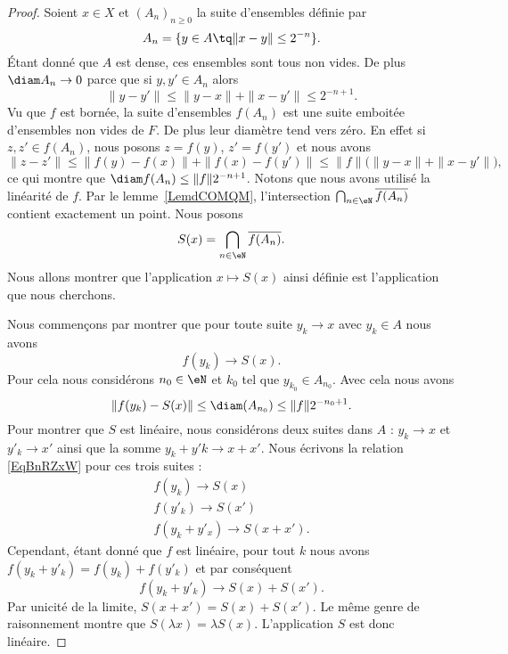 \begin{proof}
	Soient \( x\in X\) et \( (A_n)_{n\geq 0}\) la suite d'ensembles définie par
	\begin{equation}
		A_n=\{ y\in A\tq \| x-y \|\leq 2^{-n}\}.
	\end{equation}
	Étant donné que \( A\) est dense, ces ensembles sont tous non vides. De plus \( \diam A_n\to 0\) parce que si \( y,y'\in A_n\) alors
	\begin{equation}
		\| y-y' \|\leq\| y-x \|+\| x-y' \|\leq 2^{-n+1}.
	\end{equation}
	Vu que \( f\) est bornée, la suite d'ensembles \( f(A_n)\) est une suite emboitée d'ensembles non vides de \( F\). De plus leur diamètre tend vers zéro. En effet si \( z,z'\in f(A_n)\), nous posons \( z=f(y)\), \( z'=f(y')\) et nous avons
	\begin{equation}
		\| z-z' \|\leq \| f(y)-f(x) \|+\| f(x)-f(y') \|\leq \| f \|\big( \| y-x \|+\| x-y' \| \big),
	\end{equation}
	ce qui montre que \( \diam f(A_n)\leq \| f \|2^{-n+1}\).  Notons que nous avons utilisé la linéarité de \( f\). Par le lemme~\ref{LemdCOMQM}, l'intersection \( \bigcap_{n\in \eN}\overline{ f(A_n) }\) contient exactement un point. Nous posons
	\begin{equation}
		S(x)=\bigcap_{n\in \eN}\overline{ f(A_n) }.
	\end{equation}
	Nous allons montrer que l'application \( x\mapsto S(x)\) ainsi définie est l'application que nous cherchons.

	Nous commençons par montrer que pour toute suite \( y_k\to x\) avec \( y_k\in A\) nous avons
	\begin{equation}    \label{EqBnRZxW}
		f(y_k)\to S(x).
	\end{equation}
	Pour cela nous considérons \( n_0\in \eN\) et \( k_0\) tel que \( y_{k_0}\in A_{n_0}\). Avec cela nous avons
	\begin{equation}
		\| f(y_k)-S(x) \|\leq \diam(A_{n_0})\leq \| f \|2^{-n_0+1}.
	\end{equation}
	Pour montrer que \( S\) est linéaire, nous considérons deux suites dans \( A\) : \( y_k\to x\) et \( y'_k\to x'\) ainsi que la somme \( y_k+y'k\to x+x'\). Nous écrivons la relation \eqref{EqBnRZxW} pour ces trois suites :
	\begin{subequations}
		\begin{align}
			f(y_k)\to S(x)   \\
			f(y'_k)\to S(x') \\
			f(y_k+y'_x)\to S(x+x').
		\end{align}
	\end{subequations}
	Cependant, étant donné que \( f\) est linéaire, pour tout \( k\) nous avons \( f(y_k+y'_k)=f(y_k)+f(y'_k)\) et par conséquent
	\begin{equation}
		f(y_k+y'_k)\to S(x)+S(x').
	\end{equation}
	Par unicité de la limite, \( S(x+x')=S(x)+S(x')\). Le même genre de raisonnement montre que \( S(\lambda x)=\lambda S(x)\). L'application \( S\) est donc linéaire.


\end{proof}
